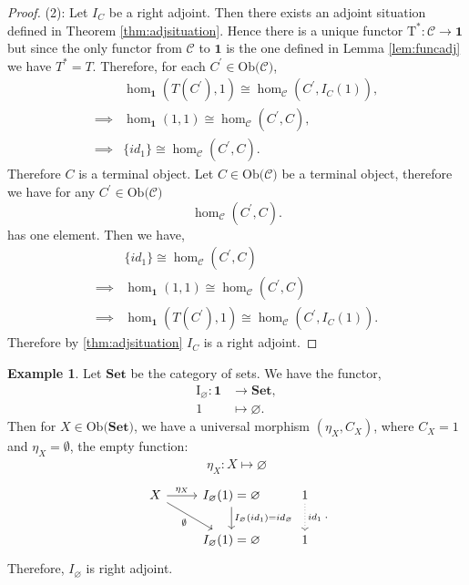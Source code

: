 \documentclass[11pt,a4paper]{article}
\theoremstyle{definition}
\newtheorem{example}[thm]{Example}
\newcommand\ho[3][]{\hom_{#1}(#2,#3)}
\newcommand\ob[1]{\mathrm{Ob(}#1\mathrm{)}}
\newcommand\cat[1]{\mathscr{#1}}
\newcommand\func[3]{\mathrm{#1}\colon#2\rightarrow#3}
\numberwithin{equation}{section}
\begin{document}
\begin{proof}
    (2):
    Let $I_{C}$ be a right adjoint. Then there exists an adjoint situation defined in Theorem \ref{thm:adjsituation}. Hence there is a unique functor $\func{T^*}{\cat{C}}{\mathbf{1}}$ but since the only functor from $\cat{C}$ to $\mathbf{1}$ is the one defined in Lemma \ref{lem:funcadj} we have $T^* = T$. Therefore, for each $C^\prime\in\ob{\cat{C}}$, 
    \begin{align*}
    &\ho[\mathbf{1}]{T(C^\prime)}{1}\cong \ho[\cat{C}]{C^\prime}{I_{C}(1)},\\
    \implies &\ho[\mathbf{1}]{1}{1}\cong \ho[\cat{C}]{C^\prime}{C},\\
    \implies & \{id_{1}\} \cong \ho[\cat{C}]{C^\prime}{C}.
    \end{align*}
    Therefore $C$ is a terminal object.
    Let $C\in\ob{\cat{C}}$ be a terminal object, therefore we have for any $C^\prime \in\ob{\cat{C}}$\[\ho[\cat{C}]{C^\prime}{C}.\] has one element. Then we have,
    \begin{align*}
        &\{id_{1}\} \cong \ho[\cat{C}]{C^\prime}{C}\\
        \implies& \ho[\mathbf{1}]{1}{1}\cong \ho[\cat{C}]{C^\prime}{C}\\
        \implies& \ho[\mathbf{1}]{T(C^\prime)}{1}\cong \ho[\cat{C}]{C^\prime}{I_{C}(1)}.
    \end{align*}
    Therefore by \ref{thm:adjsituation} $I_{C}$ is a right adjoint.
\end{proof}
\begin{example}
    Let $\mathbf{Set}$ be the category of sets. We have the functor,
    \begin{align*}
        \func{I_{\varnothing}}{\mathbf{1}&}{\mathbf{Set}}, \\
        1&\mapsto \varnothing.
    \end{align*}
    Then for $X\in\ob{\mathbf{Set}}$, we have a universal morphism $(\eta_{X},C_{X})$, where $C_{X}=1$ and $\eta_{X}=\emptyset$, the empty function:
    \begin{align*}
        \eta_{X}\colon X \mapsto \varnothing
    \end{align*}
    \begin{equation*}
    \begin{tikzcd}
    X \arrow[r, "\eta_{X}"] \arrow[rd, "\emptyset"'] & I_{\varnothing}(1) = \varnothing \arrow[d, "I_{\varnothing}(id_{1})=id_{\varnothing}"] & 1 \arrow[d,dotted,"id_{1}"] \\
    & I_{\varnothing}(1) = \varnothing & 1
    \end{tikzcd}.\\
    \end{equation*}
    Therefore, $I_{\varnothing}$ is right adjoint.
\end{example}
\end{document}
